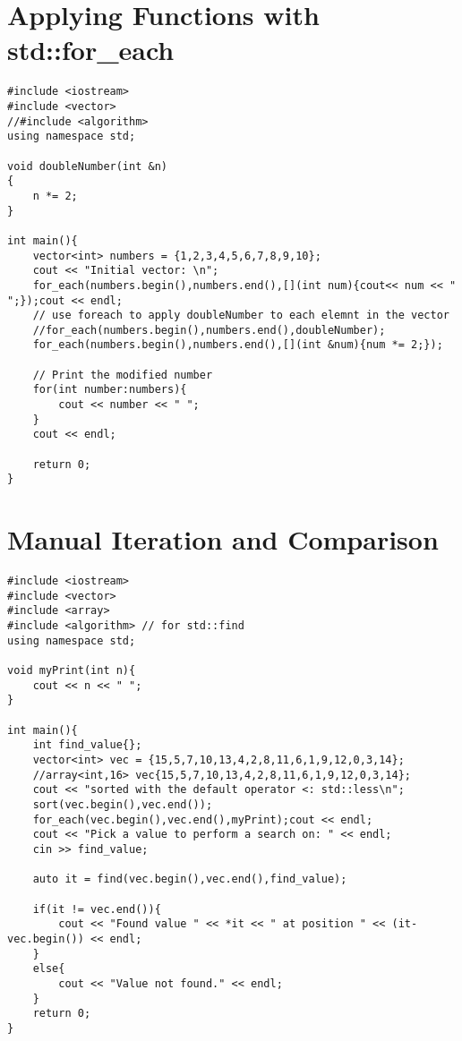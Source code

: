\documentclass[12pt]{article}
\begin{document}
\section*{Applying Functions with std::for_each}
\begin{verbatim}
#include <iostream>
#include <vector>
//#include <algorithm>
using namespace std;

void doubleNumber(int &n)
{
    n *= 2;
}

int main(){
    vector<int> numbers = {1,2,3,4,5,6,7,8,9,10};
    cout << "Initial vector: \n";
    for_each(numbers.begin(),numbers.end(),[](int num){cout<< num << " ";});cout << endl;
    // use foreach to apply doubleNumber to each elemnt in the vector
    //for_each(numbers.begin(),numbers.end(),doubleNumber);
    for_each(numbers.begin(),numbers.end(),[](int &num){num *= 2;});
    
    // Print the modified number
    for(int number:numbers){
        cout << number << " ";
    }
    cout << endl;

    return 0;
}
\end{verbatim}


\section*{Manual Iteration and Comparison}
\begin{verbatim}
#include <iostream>
#include <vector>
#include <array>
#include <algorithm> // for std::find
using namespace std;

void myPrint(int n){
    cout << n << " ";
}

int main(){
    int find_value{};
    vector<int> vec = {15,5,7,10,13,4,2,8,11,6,1,9,12,0,3,14};
    //array<int,16> vec{15,5,7,10,13,4,2,8,11,6,1,9,12,0,3,14};
    cout << "sorted with the default operator <: std::less\n";
    sort(vec.begin(),vec.end());
    for_each(vec.begin(),vec.end(),myPrint);cout << endl;
    cout << "Pick a value to perform a search on: " << endl;
    cin >> find_value;

    auto it = find(vec.begin(),vec.end(),find_value);

    if(it != vec.end()){
        cout << "Found value " << *it << " at position " << (it-vec.begin()) << endl;
    }
    else{
        cout << "Value not found." << endl;
    }
    return 0;
}
\end{verbatim}
\end{document}
